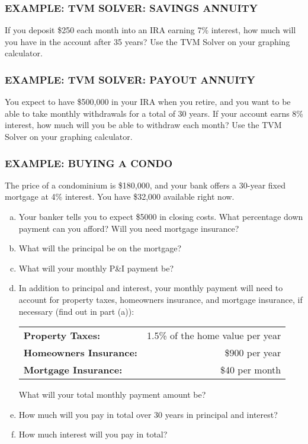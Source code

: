 \documentclass[8pt]{beamer}
\newcommand{\extitle}[1]{\frametitle{\fontfamily{fvs}\selectfont \small\color{black!70!blue!80!cyan}\uppercase{\bfseries Example: #1}}}
\newenvironment{exsol}
{
\begin{tcolorbox}[colframe=black!50!blue!50!cyan,
colback=white,
bottomrule=0mm,
rightrule=0mm,
sharp corners=all] 

}
{ \end{tcolorbox}}
\begin{document}
\begin{frame}
\extitle{TVM Solver: Savings Annuity}
If you deposit \$250 each month into an IRA earning 7\% interest, how much will you have in the account after 35 years?  Use the TVM Solver on your graphing calculator.

\begin{exsol}
\vspace{3in}
\text{}
\end{exsol}
\end{frame}

\begin{frame}
\extitle{TVM Solver: Payout Annuity}
You expect to have \$500,000 in your IRA when you retire, and you want to be able to take monthly withdrawals for a total of 30 years.  If your account earns 8\% interest, how much will you be able to withdraw each month?  Use the TVM Solver on your graphing calculator.

\begin{exsol}
\vspace{3in}
\text{}
\end{exsol}
\end{frame}

\begin{frame}
\extitle{Buying a Condo}
The price of a condominium is \$180,000, and your bank offers a 30-year fixed mortgage at 4\% interest.  You have \$32,000 available right now.
\begin{enumerate}[(a)]
\item Your banker tells you to expect \$5000 in closing costs.  What percentage down payment can you afford?  Will you need mortgage insurance?
\item What will the principal be on the mortgage?
\item What will your monthly P\&I payment be?
\item In addition to principal and interest, your monthly payment will need to account for property taxes, homeowners insurance, and mortgage insurance, if necessary (find out in part (a)):
\begin{center}
\begin{tabular}{l r}
\textbf{Property Taxes:} & 1.5\% of the home value per year\\
\textbf{Homeowners Insurance:} & \$900 per year\\
\textbf{Mortgage Insurance:} & \$40 per month
\end{tabular}
\end{center}
What will your total monthly payment amount be?
\item How much will you pay in total over 30 years in principal and interest?
\item How much interest will you pay in total?
\end{enumerate}

\begin{exsol}
\vspace{3in}
\text{}
\end{exsol}
\end{frame}
\end{document}
